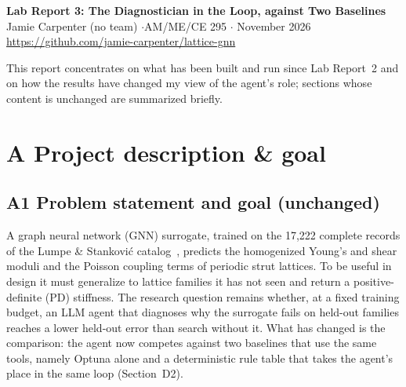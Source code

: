 \documentclass[11pt]{article}
\begin{document}
\begin{center}
  {\Large\bfseries Lab Report 3: The Diagnostician in the Loop, against Two Baselines}\\[0.5ex]
  Jamie Carpenter (no team) \quad$\cdot$\quad AM/ME/CE 295 \quad$\cdot$ November 2026\\
  \url{https://github.com/jamie-carpenter/lattice-gnn}
\end{center}

\noindent This report concentrates on what has been built and run since Lab Report~2 and on how
the results have changed my view of the agent's role; sections whose content is unchanged are
summarized briefly.

\section*{A \quad Project description \& goal}

\subsection*{A1 \quad Problem statement and goal (unchanged)}
A graph neural network (GNN) surrogate, trained on the 17,222 complete records of the Lumpe \&
Stankovi\'c catalog~\cite{lumpe}, predicts the homogenized Young's and shear moduli and the
Poisson coupling terms of periodic strut lattices. To be useful in design it must generalize to
lattice families it has not seen and return a positive-definite (PD) stiffness. The research
question remains whether, at a fixed training budget, an LLM agent that diagnoses why the
surrogate fails on held-out families reaches a lower held-out error than search without it. What
has changed is the comparison: the agent now competes against two baselines that use the same
tools, namely Optuna alone and a deterministic rule table that takes the agent's place in the same
loop (Section~D2).
\end{document}
